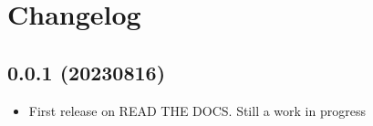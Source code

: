 \documentclass[letterpaper,10pt,english]{sphinxmanual}
\begin{document}
\sphinxstepscope


\section{Changelog}
\label{\detokenize{extras/changelog:changelog}}\label{\detokenize{extras/changelog::doc}}

\subsection{0.0.1 (2023\sphinxhyphen{}08\sphinxhyphen{}16)}
\label{\detokenize{extras/changelog:id1}}\begin{itemize}
\item {} 
\sphinxAtStartPar
First release on READ THE DOCS. Still a work in progress

\end{itemize}



\renewcommand{\indexname}{Index}
\printindex
\end{document}
